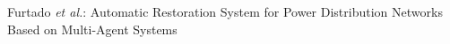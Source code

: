 \documentclass[journal]{IEEEtran}
\begin{document}
%
{Furtado \MakeLowercase{\textit{et al.}}: Automatic Restoration System for Power Distribution Networks Based on Multi-Agent Systems}
% 











\maketitle
\end{document}
